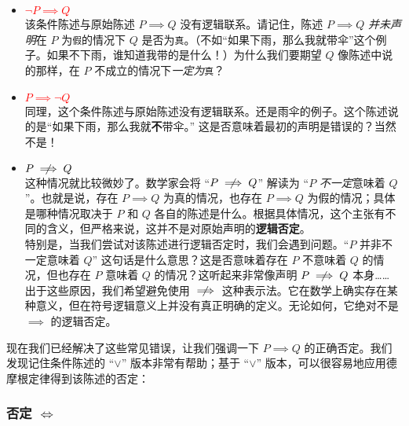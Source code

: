 \begin{itemize}
    \item \textcolor{red}{$\neg P \implies Q$} \\
        该条件陈述与原始陈述 $P \implies Q$ 没有逻辑联系。请记住，陈述 $P \implies Q$ \emph{并未声明}在 $P$ 为\verb|假|的情况下 $Q$ 是否为\verb|真|。（不如``如果下雨，那么我就带伞''这个例子。如果不下雨，谁知道我带的是什么！）为什么我们要期望 $Q$ 像陈述中说的那样，在 $P$ 不成立的情况下\emph{一定为}\verb|真|？
    \item \textcolor{red}{$P \implies \neg Q$} \\
        同理，这个条件陈述与原始陈述没有逻辑联系。还是雨伞的例子。这个陈述说的是``如果下雨，那么我就\textbf{不}带伞。'' 这是否意味着最初的声明是错误的？当然不是！
    \item \textcolor{red}{$P \notimplies Q$} \\
        这种情况就比较微妙了。数学家会将 ``$P \notimplies Q$'' 解读为 ``$P$ \emph{不一定}意味着 $Q$''。也就是说，存在 $P \implies Q$ 为真的情况，也存在 $P \implies Q$ 为假的情况；具体是哪种情况取决于 $P$ 和 $Q$ 各自的陈述是什么。根据具体情况，这个主张有不同的含义，但严格来说，这并不是对原始声明的\textbf{逻辑否定}。\\
        \newline
        特别是，当我们尝试对该陈述进行逻辑否定时，我们会遇到问题。``$P$ 并非不一定意味着 $Q$'' 这句话是什么意思？这是否意味着存在 $P$ 不意味着 $Q$ 的情况，但也存在 $P$ 意味着 $Q$ 的情况？这听起来非常像声明 $P \notimplies Q$ 本身…… \\
        \newline
        出于这些原因，我们希望避免使用 $\notimplies$ 这种表示法。它在数学上确实存在某种意义，但在符号逻辑意义上并没有真正明确的定义。无论如何，它绝对不是 $\implies$ 的逻辑否定。
\end{itemize}
现在我们已经解决了这些常见错误，让我们强调一下 $P \implies Q$ 的正确否定。我们发现记住条件陈述的 ``$\lor$'' 版本非常有帮助；基于 ``$\lor$'' 版本，可以很容易地应用德摩根定律得到该陈述的否定：

\setlength{\fboxrule}{2pt}
\begin{center}
\end{center}

\subsubsection*{否定 $\iff$}

